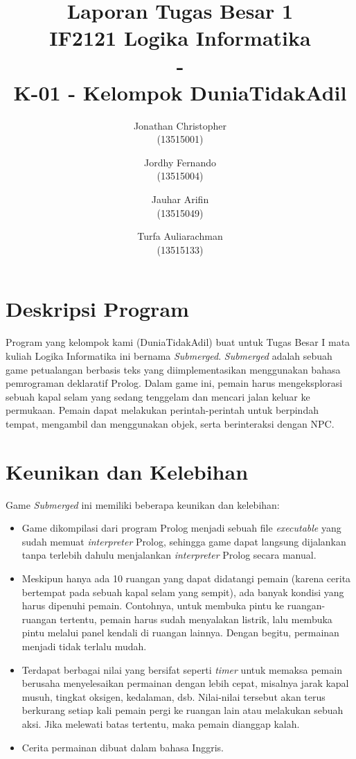 \documentclass[a4paper,titlepage]{article}
\begin{document}
	\title{Laporan Tugas Besar 1 \\ IF2121 Logika Informatika \\ - \\ \large K-01 - Kelompok DuniaTidakAdil}
	\author{
			Jonathan Christopher \\
			(13515001)
		\and
			Jordhy Fernando \\
			(13515004)
		\and
			Jauhar Arifin \\
			(13515049)
		\and
			Turfa Auliarachman \\
			(13515133)
	}
	\maketitle

	\section{Deskripsi Program}

		Program yang kelompok kami (DuniaTidakAdil) buat untuk Tugas Besar I mata kuliah Logika Informatika ini bernama \textit{Submerged}. \textit{Submerged} adalah sebuah game petualangan berbasis teks yang diimplementasikan menggunakan bahasa pemrograman deklaratif Prolog. Dalam game ini, pemain harus mengeksplorasi sebuah kapal selam yang sedang tenggelam dan mencari jalan keluar ke permukaan. Pemain dapat melakukan perintah-perintah untuk berpindah tempat, mengambil dan menggunakan objek, serta berinteraksi dengan NPC.

	\section{Keunikan dan Kelebihan}

		Game \textit{Submerged} ini memiliki beberapa keunikan dan kelebihan:

		\begin{itemize}
			\item Game dikompilasi dari program Prolog menjadi sebuah file \textit{executable} yang sudah memuat \textit{interpreter} Prolog, sehingga game dapat langsung dijalankan tanpa terlebih dahulu menjalankan \textit{interpreter} Prolog secara manual.
			\item Meskipun hanya ada 10 ruangan yang dapat didatangi pemain (karena cerita bertempat pada sebuah kapal selam yang sempit), ada banyak kondisi yang harus dipenuhi pemain. Contohnya, untuk membuka pintu ke ruangan-ruangan tertentu, pemain harus sudah menyalakan listrik, lalu membuka pintu melalui panel kendali di ruangan lainnya. Dengan begitu, permainan menjadi tidak terlalu mudah.
			\item Terdapat berbagai nilai yang bersifat seperti \textit{timer} untuk memaksa pemain berusaha menyelesaikan permainan dengan lebih cepat, misalnya jarak kapal musuh, tingkat oksigen, kedalaman, dsb. Nilai-nilai tersebut akan terus berkurang setiap kali pemain pergi ke ruangan lain atau melakukan sebuah aksi. Jika melewati batas tertentu, maka pemain dianggap kalah.
			\item Cerita permainan dibuat dalam bahasa Inggris.
		\end{itemize}
\end{document}
